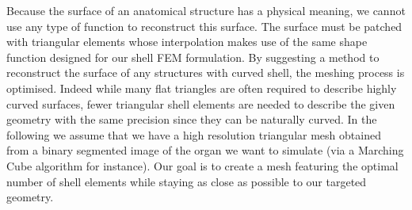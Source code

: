 \documentclass{llncs}
\begin{document}

Because the surface of an anatomical structure has a physical meaning, we cannot use any type of function to reconstruct this surface. The surface must be patched with triangular elements whose interpolation makes use of the same shape function designed for our shell FEM formulation. By suggesting a method to reconstruct the surface of any structures with curved shell, the meshing process is optimised. Indeed while many flat triangles are often required to describe highly curved surfaces, fewer triangular shell elements are needed to describe the given geometry with the same precision since they can be naturally curved. In the following we assume that we have a high resolution triangular mesh obtained from a binary segmented image of the organ we want to simulate (via a Marching Cube algorithm for instance). Our goal is to create a mesh featuring the optimal number of shell elements while staying as close as possible to our targeted geometry. 
\end{document}
